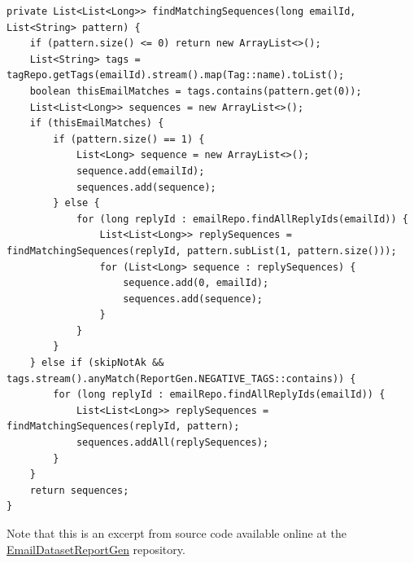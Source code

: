 \documentclass[a4paper, 12pt]{article}
\begin{document}
		\begin{verbatim}
private List<List<Long>> findMatchingSequences(long emailId, List<String> pattern) {
	if (pattern.size() <= 0) return new ArrayList<>();
	List<String> tags = tagRepo.getTags(emailId).stream().map(Tag::name).toList();
	boolean thisEmailMatches = tags.contains(pattern.get(0));
	List<List<Long>> sequences = new ArrayList<>();
	if (thisEmailMatches) {
		if (pattern.size() == 1) {
			List<Long> sequence = new ArrayList<>();
			sequence.add(emailId);
			sequences.add(sequence);
		} else {
			for (long replyId : emailRepo.findAllReplyIds(emailId)) {
				List<List<Long>> replySequences = findMatchingSequences(replyId, pattern.subList(1, pattern.size()));
				for (List<Long> sequence : replySequences) {
					sequence.add(0, emailId);
					sequences.add(sequence);
				}
			}
		}
	} else if (skipNotAk && tags.stream().anyMatch(ReportGen.NEGATIVE_TAGS::contains)) {
		for (long replyId : emailRepo.findAllReplyIds(emailId)) {
			List<List<Long>> replySequences = findMatchingSequences(replyId, pattern);
			sequences.addAll(replySequences);
		}
	}
	return sequences;
}
		\end{verbatim}
		
		\footnotesize
		Note that this is an excerpt from source code available online at the \href{https://github.com/ArchitecturalKnowledgeAnalysis/EmailDatasetReportGen/blob/fed23ead1039c99524e5dba7e797e942a55254ba/src/main/java/nl/andrewl/emaildatasetreportgen/pattern/NGramPatternSearcher.java}{EmailDatasetReportGen} repository.
		\normalsize
\end{document}
